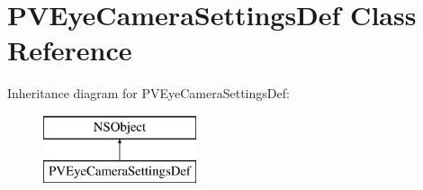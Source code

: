 \hypertarget{interface_p_v_eye_camera_settings_def}{}\section{P\+V\+Eye\+Camera\+Settings\+Def Class Reference}
\label{interface_p_v_eye_camera_settings_def}
Inheritance diagram for P\+V\+Eye\+Camera\+Settings\+Def\+:\begin{figure}[H]
\begin{center}
\leavevmode
\includegraphics[height=2.000000cm]{interface_p_v_eye_camera_settings_def}
\end{center}
\end{figure}
